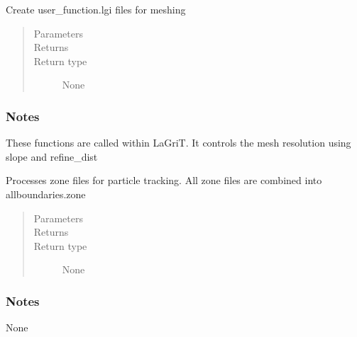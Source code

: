 \documentclass[letterpaper,10pt,english]{sphinxmanual}
\begin{document}
\begin{fulllineitems}
\label{\detokenize{pydfnworks:pydfnworks.dfnGen.lagrit_scripts.create_user_functions}}
Create user\_function.lgi files for meshing
\begin{quote}\begin{description}
\item[{Parameters}] \leavevmode
{} \textendash{} 

\item[{Returns}] \leavevmode


\item[{Return type}] \leavevmode
None

\end{description}\end{quote}
\subsubsection*{Notes}

These functions are called within LaGriT. It controls the mesh resolution using slope and refine\_dist

\end{fulllineitems}


\begin{fulllineitems}
\label{\detokenize{pydfnworks:pydfnworks.dfnGen.lagrit_scripts.define_zones}}
Processes zone files for particle tracking. All zone files are combined into allboundaries.zone
\begin{quote}\begin{description}
\item[{Parameters}] \leavevmode
{} \textendash{} 

\item[{Returns}] \leavevmode


\item[{Return type}] \leavevmode
None

\end{description}\end{quote}
\subsubsection*{Notes}

None

\end{fulllineitems}
\end{document}
